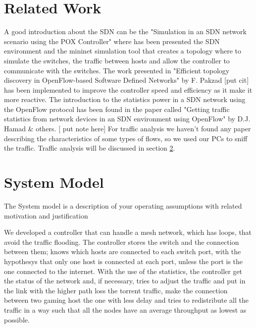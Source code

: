 \documentclass[conference,10pt]{IEEEtran}
\begin{document}
\section{Related Work}\label{sec:sota}
A good introduction about the SDN can be the  "Simulation in an SDN network scenario using the
POX Controller" where has been presented the SDN environment and the mininet simulation
tool that creates a topology where to simulate the switches, the traffic between hosts and
allow the controller to communicate with the switches. The work presented in
"Efficient topology discovery in OpenFlow-based Software Defined Networks" by F. Pakzad [put cit]
has been implemented to improve the controller speed and efficiency as it make it more reactive.
The introduction to the statistics power in a SDN network using the OpenFlow protocol has been found
in the paper called "Getting traffic statistics from network devices in an
SDN environment using OpenFlow" by D.J. Hamad & others. [ put note here]
For traffic analysis we haven't found any paper describing the characteristics of
some types of flows, so we used our PCs to sniff the traffic. Traffic analysis will be discussed in section \ref{sec:symo}.


\section{System Model}\label{sec:symo}
The System model is a description of your operating assumptions with related motivation and justification


We developed a controller that can handle a mesh network, which has loops, that avoid
the traffic flooding. The controller stores the switch and the connection between them;
knows which hosts are connected to each switch port, with the hypothesys that only one
host is connected at each port, unless the port is the one connected to the internet.
With the use of the statistics, the controller get the status of the network and, if necessary,
tries to adjust the traffic and put in the link with the higher path loss the torrent traffic,
make the connection between two gaming host the one with less delay and tries to redistribute all the traffic in a way
such that all the nodes have an average throughput as lowest as possible.
\end{document}
